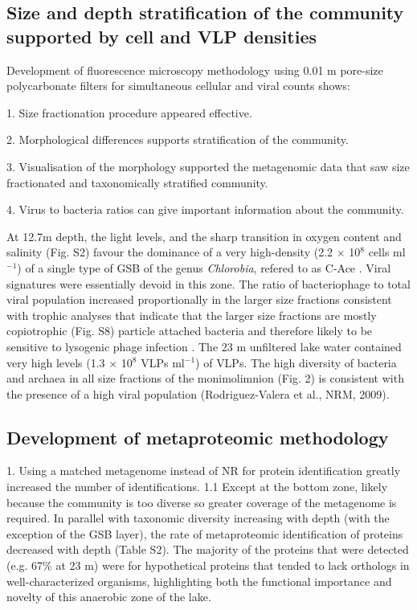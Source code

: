 \subsection[Community stratification supported by cell and \ac{VLP} densities]{Size and depth stratification of the community supported by cell and \ac{VLP} densities}
Development of fluorescence microscopy methodology using 0.01 \textmu{}m pore-size polycarbonate filters for simultaneous cellular and viral counts shows:

1. Size fractionation procedure appeared effective.

2. Morphological differences supports stratification of the community.

3. Visualisation of the morphology supported the metagenomic data that saw size fractionated and taxonomically stratified community.

4. Virus to bacteria ratios can give important information about the community.

At 12.7m depth, the light levels, and the sharp transition in oxygen content and salinity (Fig. S2) favour the dominance of a very high-density (2.2 $\times$ 10$^8$ cells ml$^{-1}$) of a single type of \ac{GSB} of the genus \emph{Chlorobia}, refered to as C-Ace \cite{Ng2010a}. 
Viral signatures were essentially devoid in this zone. 
The ratio of bacteriophage to total viral population increased proportionally in the larger size fractions consistent with trophic analyses that indicate that the larger size fractions are mostly copiotrophic (Fig. S8) particle attached bacteria and therefore likely to be sensitive to lysogenic phage infection \cite{Lauro2009}. 
The 23 m unfiltered lake water contained very high levels (1.3 $\times$ 10$^8$ \acp{VLP} ml$^{-1}$) of \acp{VLP}. 
The high diversity of bacteria and archaea in all size fractions of the monimolimnion (Fig. 2) is consistent with the presence of a high viral population (Rodriguez-Valera et al., NRM, 2009).


\subsection{Development of metaproteomic methodology}

1. Using a matched metagenome instead of \ac{NR} for protein identification greatly increased the number of identifications.
1.1 Except at the bottom zone, likely because the community is too diverse so greater coverage of the metagenome is required. %
In parallel with taxonomic diversity increasing with depth (with the exception of the GSB layer), the rate of metaproteomic identification of proteins decreased with depth (Table S2). 
The majority of the proteins that were detected (e.g. 67\% at 23 m) were for hypothetical proteins that tended to lack orthologs in well-characterized organisms, highlighting both the functional importance and novelty of this anaerobic zone of the lake.


